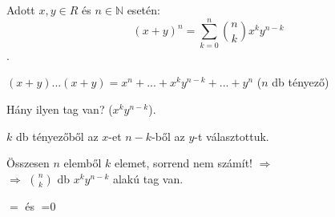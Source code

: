 \begin{frame}
  \begin{tcolorbox}[title={Tétel: Binomiális tétel}]
    Adott $x, y \in R$ és $n \in \mathbb{N}$ esetén:\\
    $$(x + y)^n = \sum_{k = 0}^n {n \choose k} x^ky^{n - k}$$.
  \tcblower
    \\
    \mmedskip

    $(x + y) ... (x + y) = x^n + ... + x^ky^{n - k} + ... + y^n$ ($n$ db tényező)\\
    \mmedskip

    Hány ilyen tag van? ($x^ky^{n - k}$).\\
    \mmedskip

    $k$ db tényezőből az $x$-et $n - k$-ből az $y$-t választottuk.\\
    \msmallskip
    
    Összesen $n$ elemből $k$ elemet, sorrend nem számít! $\Rightarrow$\\
    $\Rightarrow$ ${n \choose k}$ db $x^ky^{n - k}$ alakú tag van.
  \end{tcolorbox}


  \begin{tcolorbox}[title={Tétel: Következmény (Binomiális tétel)}]
    $\displaystyle \mathop{\sum_{k = 0}^n {n \choose k} = 2^n}$ és $\displaystyle \mathop{\sum_{i = 0}^n {n \choose k} (-1)^k = 0}$
  \end{tcolorbox}
\end{frame}


